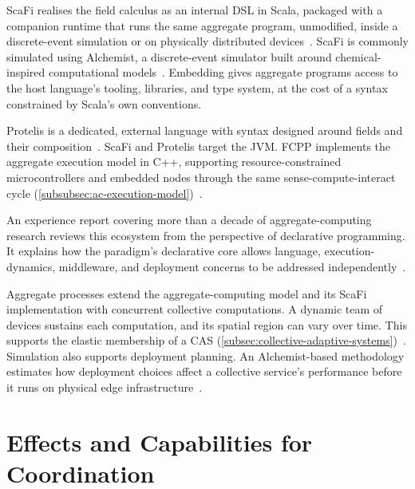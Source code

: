 ScaFi realises the field calculus as an internal \ac{DSL} in Scala,
packaged with a companion runtime that runs the same aggregate program, unmodified, inside a discrete-event simulation or on physically distributed devices~\cite{casadei2022scafi}.
%
ScaFi is commonly simulated using Alchemist,
a discrete-event simulator built around chemical-inspired computational models~\cite{DBLP:journals/jos/PianiniMV13}.
%
Embedding gives aggregate programs access to the host language's tooling, libraries, and type system,
at the cost of a syntax constrained by Scala's own conventions.

Protelis is a dedicated, external language with syntax designed around fields and their composition~\cite{pianini2015protelis}.
%
ScaFi and Protelis target the JVM.
FCPP implements the aggregate execution model in C++,
supporting resource-constrained microcontrollers and embedded nodes through the same sense-compute-interact cycle (\cref{subsubsec:ac-execution-model})~\cite{DBLP:journals/scp/AudritoT24}.

An experience report covering more than a decade of aggregate-computing research reviews this ecosystem from the perspective of declarative programming.
It explains how the paradigm's declarative core allows language,
execution-dynamics,
middleware,
and deployment concerns to be addressed independently~\cite{10.1145/3678232.3678235}.

Aggregate processes extend the aggregate-computing model and its ScaFi implementation with concurrent collective computations.
A dynamic team of devices sustains each computation, and its spatial region can vary over time.
This supports the elastic membership of a \ac{CAS} (\cref{subsec:collective-adaptive-systems})~\cite{CASADEI2021104081}.
%
Simulation also supports deployment planning.
An Alchemist-based methodology estimates how deployment choices affect a collective service's performance before it runs on physical edge infrastructure~\cite{DBLP:journals/iotj/CasadeiFPPSV22}.

\section{Effects and Capabilities for Coordination}
\label{sec:advanced-linguistic-abstractions}

